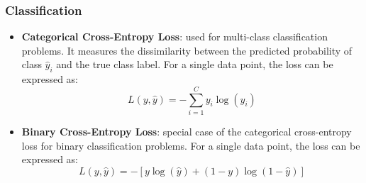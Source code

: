 \subsubsection*{Classification}
\begin{itemize}
    \item \textbf{Categorical Cross-Entropy Loss}: used for multi-class classification problems. It measures the dissimilarity between the predicted
    probability of class $\hat{y}_i$ and the true class label.
    For a single data point, the loss can be expressed as:
    \begin{equation*}
        L(y, \hat{y}) = -\sum_{i=1}^{C} y_i \log(\hat{y}_i)
    \end{equation*}
    \item \textbf{Binary Cross-Entropy Loss}: special case of the categorical cross-entropy loss for binary classification problems.
    For a single data point, the loss can be expressed as:
    \begin{equation*}
        L(y, \hat{y}) = -[y \log(\hat{y}) + (1 - y) \log(1 - \hat{y})]
    \end{equation*}
\end{itemize}

